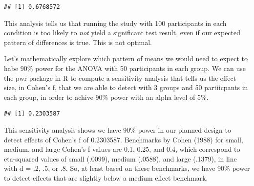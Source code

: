 \documentclass[]{book}
\newenvironment{Shaded}{\begin{snugshade}}{\end{snugshade}}
\newcommand{\CommentTok}[1]{\textcolor[rgb]{0.56,0.35,0.01}{\textit{#1}}}
\newcommand{\DataTypeTok}[1]{\textcolor[rgb]{0.13,0.29,0.53}{#1}}
\newcommand{\DecValTok}[1]{\textcolor[rgb]{0.00,0.00,0.81}{#1}}
\newcommand{\FloatTok}[1]{\textcolor[rgb]{0.00,0.00,0.81}{#1}}
\newcommand{\KeywordTok}[1]{\textcolor[rgb]{0.13,0.29,0.53}{\textbf{#1}}}
\newcommand{\NormalTok}[1]{#1}
\newcommand{\OperatorTok}[1]{\textcolor[rgb]{0.81,0.36,0.00}{\textbf{#1}}}
\newcommand{\StringTok}[1]{\textcolor[rgb]{0.31,0.60,0.02}{#1}}
\begin{document}
\begin{Shaded}
\end{Shaded}

\begin{verbatim}
## [1] 0.6768572
\end{verbatim}

This analysis tells us that running the study with 100 participants in each condition is too likely to \emph{not} yield a significant test result, even if our expected pattern of differences is true. This is not optimal.

Let's mathematically explore which pattern of means we would need to expect to habe 90\% power for the ANOVA with 50 participants in each group. We can use the pwr package in R to compute a sensitivity analysis that tells us the effect size, in Cohen's f, that we are able to detect with 3 groups and 50 partiicpants in each group, in order to achive 90\% power with an alpha level of 5\%.

\begin{Shaded}
\end{Shaded}

\begin{verbatim}
## [1] 0.2303587
\end{verbatim}

This sensitivity analysis shows we have 90\% power in our planned design to detect effects of Cohen's f of 0.2303587. Benchmarks by Cohen (1988) for small, medium, and large Cohen's f values are 0.1, 0.25, and 0.4, which correspond to eta-squared values of small (.0099), medium (.0588), and large (.1379), in line with d = .2, .5, or .8. So, at least based on these benchmarks, we have 90\% power to detect effects that are slightly below a medium effect benchmark.
\end{document}
